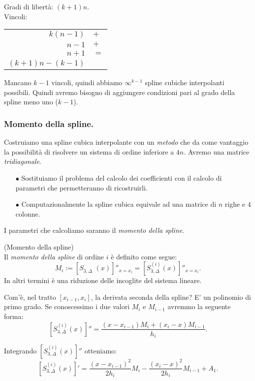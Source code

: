 \begin{flushleft}
Gradi di libertà: $(k+1)n$.\\
Vincoli:\\
\begin{tabular}{rl}
$k(n-1)$ &$+$\\
$ n-1$ &$+$\\
$ n+1 $&$=$\\
\hline 
$(k+1)n -(k-1)$
\end{tabular}
\end{flushleft}

Mancano $k-1$ vincoli, quindi abbiamo $\infty^{k-1}$ spline cubiche 
interpolanti possibili. Quindi avremo bisogno di aggiungere condizioni
pari al grado della spline meno uno ($k-1$).

\subsubsection{Momento della spline.}
Costruiamo una spline cubica interpolante con un \emph{metodo} che da come
vantaggio la possibilità di risolvere un sistema di ordine inferiore a
$4n$. Avremo una matrice \emph{tridiagonale}.
\begin{itemize}
\item[$\bullet$] Sostituiamo il problema del calcolo dei coefficienti con il
calcolo di parametri che permetteranno di ricostruirli.
\item[$\bullet$] Computazionalmente la spline cubica equivale ad una matrice
di $n$ righe e $4$ colonne.
\end{itemize}
I parametri che calcoliamo saranno il \emph{momento della spline}.
\begin{defi}(Momento della spline)\\
Il \emph{momento della spline} di ordine $i$ è definito come segue:
\[
M_i := \left[S_{3,\Delta}^{\phantom{(1)}}(x) \right]''_{x = x_i} = 
\left[S_{3,\Delta}^{(i)}(x) \right]''_{x = x_i}.
\]
In altri termini è una riduzione delle incoglite del sistema lineare.
\end{defi}

Com'è, nel tratto $[x_{i-1}, x_i]$, la derivata seconda della spline? E'
un polinomio di primo grado. Se conoscessimo i due valori $M_i$ e $M_{i-1}$
avremmo la seguente forma:
\[
\left[S_{3,\Delta}^{(i)}(x) \right]'' = 
\frac{(x-x_{i-1})M_i + (x_i-x)M_{i-1}}{h_i}.
\]

Integrando $[S_{3,\Delta}^{(i)}(x)]''$ otteniamo:
\[
\left[S_{3,\Delta}^{(i)}(x) \right]' = \frac{(x-x_{i-1})^2}{2h_i}M_i 
- \frac{(x_i-x)^2}{2h_i}M_{i-1} + A_1.
\]

